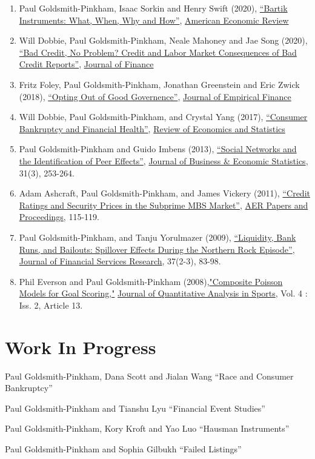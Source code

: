 \documentclass[letterpaper]{article}
\renewenvironment{itemize}{
  \begin{list}{}
    { \setlength{\itemsep}{5pt}
      \setlength{\parsep}{0pt}
      \setlength{\topsep}{0pt}
      \setlength{\leftmargin}{0em} } }{
  \end{list}}
\begin{document}
\begin{enumerate}
\item Paul Goldsmith-Pinkham, Isaac Sorkin and Henry Swift (2020), \href{http://paulgp.github.io/papers/bartik_gpss.pdf}{``Bartik Instruments: What, When, Why and How''}, \ul{American Economic Review}
\item Will Dobbie, Paul Goldsmith-Pinkham, Neale Mahoney and Jae Song (2020), \href{https://papers.ssrn.com/sol3/papers.cfm?abstract_id=2844316}{``Bad Credit, No Problem? Credit and Labor Market Consequences of Bad Credit Reports''}, \ul{Journal of Finance}
\item Fritz Foley, Paul Goldsmith-Pinkham, Jonathan Greenstein and Eric Zwick (2018), \href{http://www.nber.org/papers/w19953}{``Opting Out of Good Governence''}, \ul{Journal of Empirical Finance}
\item Will Dobbie, Paul Goldsmith-Pinkham, and Crystal Yang (2017), \href{http://www.nber.org/papers/w21032}{``Consumer Bankruptcy and Financial Health''}, \ul{Review of Economics and Statistics}
\item Paul Goldsmith-Pinkham and Guido Imbens (2013), \href{http://www.tandfonline.com/doi/pdf/10.1080/07350015.2013.801251}{``Social Networks and the Identification of Peer Effects''}, \ul{Journal of Business \& Economic Statistics}, 31(3), 253-264.
\item Adam Ashcraft, Paul Goldsmith-Pinkham, and James Vickery (2011), \href{http://papers.ssrn.com.ezp-prod1.hul.harvard.edu/sol3/papers.cfm?abstract_id=1856823}{``Credit Ratings
    and Security Prices in the Subprime MBS Market''}, \ul{AER Papers and Proceedings},  115-119. 
\item Paul Goldsmith-Pinkham, and Tanju Yorulmazer (2009), \href{http://www.springerlink.com/content/ww187761jgr660q5/}{``Liquidity, Bank Runs, and Bailouts: Spillover Effects During the Northern Rock Episode''}, \ul{Journal of Financial Services Research}, 37(2-3), 83-98. 
\item Phil Everson and Paul Goldsmith-Pinkham (2008),\href{http://www.bepress.com/jqas/vol4/iss2/13/}{"Composite Poisson Models for Goal Scoring,"} \ul{Journal of Quantitative Analysis in Sports}, Vol. 4 : Iss. 2, Article 13.
\end{enumerate}


\section*{Work In Progress}
\begin{itemize}
\item Paul Goldsmith-Pinkham, Dana Scott and Jialan Wang ``Race and Consumer Bankruptcy''
\item Paul Goldsmith-Pinkham and Tianshu Lyu ``Financial Event Studies''
\item Paul Goldsmith-Pinkham, Kory Kroft and Yao Luo ``Hausman Instruments''
\item Paul Goldsmith-Pinkham and Sophia Gilbukh ``Failed Listings''
\end{itemize}
\end{document}
